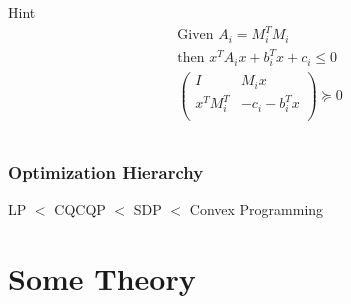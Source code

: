 \documentclass[11pt]{beamer}
\begin{document}
\begin{frame}
\begin{itemize}[leftmargin=-0.3cm]
\begin{columns}
\begin{column}{0.5\textwidth}
			\begin{block}{Hint}
			\scriptsize
			\begin{equation*}
			\begin{aligned}
			\text{Given }A_i=M_i^TM_i\\
			\text{then }x^TA_ix+b_i^Tx+c_i\leq 0 \\
			\begin{pmatrix}
			I & M_ix\\
			x^TM_i^T & -c_i-b_i^Tx\\
			\end{pmatrix}
			\succeq 0
			\end{aligned}
			\end{equation*}
			\end{block}
		\end{column}
		\end{columns}
		\end{itemize}
	\end{frame}
	\begin{frame}
		\frametitle{Optimization Hierarchy}
		\begin{block}{\vspace{-3ex}}
			\centering \large LP $<$ CQCQP $<$ SDP $<$ Convex Programming
		\end{block}
	\end{frame}


\section{Some Theory}
\end{document}
